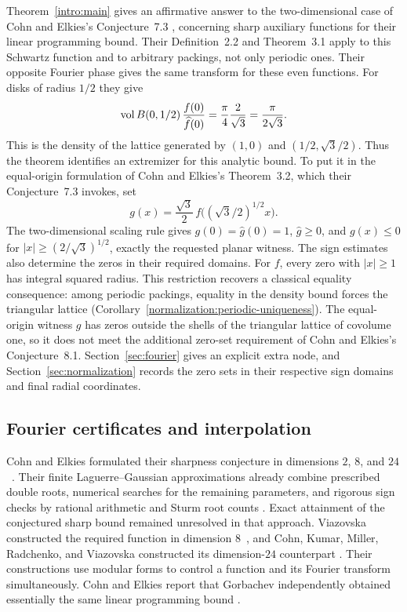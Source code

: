 Theorem~\ref{intro:main} gives an affirmative answer to the
two-dimensional case of Cohn and Elkies's Conjecture~7.3
\cite{CohnElkies2003}, concerning sharp auxiliary functions for their
linear programming bound. Their Definition~2.2 and Theorem~3.1 apply to
this Schwartz function and to arbitrary packings, not only periodic ones.
Their opposite Fourier phase gives the same transform for these even
functions.
For disks of radius $1/2$ they give
\[
  \operatorname{vol} B(0,1/2)\,\frac{f(0)}{\widehat f(0)}
  =\frac{\pi}{4}\frac{2}{\sqrt3}
  =\frac{\pi}{2\sqrt3}.
\]
This is the density of the lattice generated by $(1,0)$ and
$(1/2,\sqrt3/2)$. Thus the theorem identifies an extremizer for this
analytic bound. To put it in the equal-origin formulation of
Cohn and Elkies's Theorem~3.2, which their Conjecture~7.3 invokes, set
\[
 g(x)=\frac{\sqrt3}{2}\,
       f\bigl((\sqrt3/2)^{1/2}x\bigr).
\]
The two-dimensional scaling rule gives $g(0)=\widehat g(0)=1$,
$\widehat g\ge0$, and $g(x)\le0$ for
$|x|\ge(2/\sqrt3)^{1/2}$, exactly the requested planar witness.
The sign estimates also determine the zeros in their required domains.
For $f$, every zero with $|x|\ge1$ has integral squared radius. This
restriction recovers a classical equality consequence: among periodic
packings, equality in the density bound forces the triangular lattice
(Corollary~\ref{normalization:periodic-uniqueness}). The equal-origin
witness $g$ has zeros outside the shells of the triangular lattice of
covolume one, so it does not meet the additional zero-set requirement of
Cohn and Elkies's Conjecture~8.1. Section~\ref{sec:fourier} gives an explicit
extra node, and Section~\ref{sec:normalization} records the zero sets in
their respective sign domains and final radial coordinates.

\subsection{Fourier certificates and interpolation}

Cohn and Elkies formulated their sharpness conjecture in dimensions
$2$, $8$, and $24$~\cite[Conjecture~7.3]{CohnElkies2003}.
Their finite Laguerre--Gaussian approximations already combine prescribed
double roots, numerical searches for the remaining parameters, and rigorous
sign checks by rational arithmetic and Sturm root counts
\cite[Section~7, pp.~704--705]{CohnElkies2003}. Exact attainment of the
conjectured sharp bound remained unresolved in that approach.
Viazovska constructed the required function in dimension
$8$~\cite[Theorems~3 and~4]{Viazovska2017}, and Cohn, Kumar, Miller,
Radchenko, and Viazovska constructed its dimension-$24$ counterpart
\cite[Section~4]{CKMRV2017}.
Their constructions use modular forms to control a function and its
Fourier transform simultaneously.
Cohn and Elkies report that Gorbachev independently obtained essentially
the same linear programming bound \cite[p.~694]{CohnElkies2003}.

